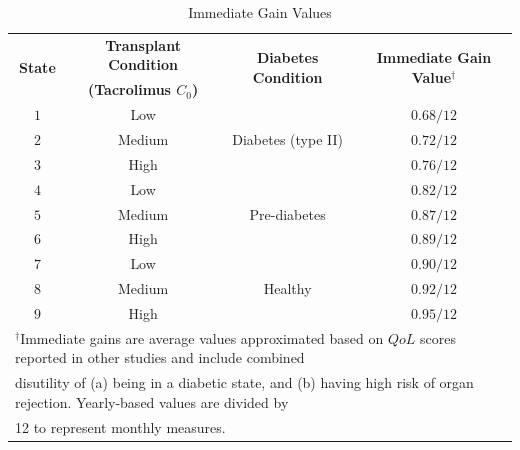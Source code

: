 \documentclass[opre,nonblindrev]{informs2}%
\newcommand{\1}{\hbox{\rm 1\kern-.35em 1}}
\begin{document}
{
	\renewcommand{\arraystretch}{1.2}
	\begin{table}[t]
				\caption{\baselineskip=10pt Immediate Gain Values}\label{Table:Gain}
				\begin{center}
\scriptsize
		   \begin{tabular}{cccc}
				\hline
				\multirow{2}{*}{{\bf State}} & \multicolumn{1}{c}{\bf Transplant Condition} & \multirow{2}{*}{{\bf Diabetes Condition}}& \multirow{2}{*}{{\bf Immediate Gain Value$^\dag$}} \\
				& \multicolumn{1}{c}{\bf (Tacrolimus $C_0$)} & \\
				\hline
				$1$ & Low & \multirow{3}{*}{Diabetes (type II)} & $0.68/12$\\
				$2$ & Medium &  &$0.72/12$\\
				$3$ & High &  & $0.76/12$\\ \hline
				$4$ & Low & \multirow{3}{*}{Pre-diabetes}& $0.82/12$ \\
				$5$ & Medium & &$0.87/12$\\
				$6$ & High & & $0.89/12$\\ \hline
				$7$ & Low & \multirow{3}{*}{Healthy} &$0.90/12$\\
				$8$ & Medium & &$0.92/12$\\
				$9$ & High & &$0.95/12$\\
				\hline
\multicolumn{4}{l}{$^\dag$\normalfont Immediate gains are average values approximated based on $QoL$ scores reported in other studies and include combined}\\
\multicolumn{4}{l}{disutility of (a) being in a diabetic state, and (b) having high risk of organ rejection. Yearly-based values are divided by}\\
		\multicolumn{4}{l}{12 to represent monthly measures.}
			\end{tabular}
		\end{center}
	\end{table}
}
\end{document}
